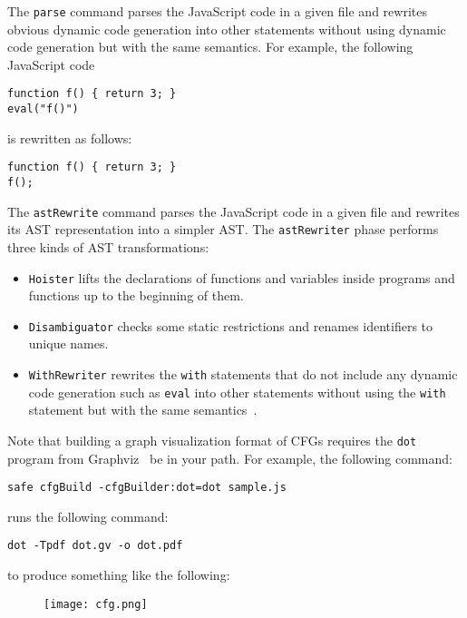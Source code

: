 \medskip
The \verb!parse! command parses the JavaScript code in a given file and
rewrites obvious dynamic code generation into other statements without using
dynamic code generation but with the same semantics.  For example, the following
JavaScript code
\begin{verbatim}
function f() { return 3; }
eval("f()")
\end{verbatim}
is rewritten as follows:
\begin{verbatim}
function f() { return 3; }
f();
\end{verbatim}

\medskip
The \verb!astRewrite! command parses the JavaScript code in a given file and
rewrites its AST representation into a simpler AST.
The \verb!astRewriter! phase performs three kinds of AST transformations:
\begin{itemize}
\item \verb!Hoister! lifts the declarations of functions and variables inside
programs and functions up to the beginning of them.
\item \verb!Disambiguator! checks some static restrictions and renames identifiers
to unique names.
\item \verb!WithRewriter! rewrites the \verb!with! statements that do not include
any dynamic code generation such as \verb!eval! into other statements without using
the \verb!with! statement but with the same semantics~\cite{dls13,withtr}.
\end{itemize}

Note that building a graph visualization format of CFGs requires the \verb!dot! program
from Graphviz~\cite{graphviz} be in your path.
For example, the following command:
\begin{verbatim}
safe cfgBuild -cfgBuilder:dot=dot sample.js
\end{verbatim}
runs the following command:
\begin{verbatim}
dot -Tpdf dot.gv -o dot.pdf
\end{verbatim}
to produce something like the following:
\begin{figure}[H]
\texttt{[image: cfg.png]}
\end{figure}

